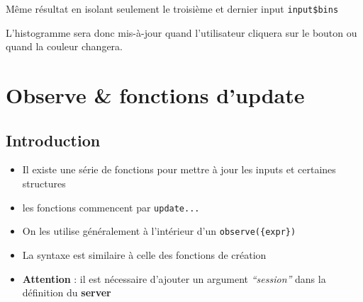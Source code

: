 \documentclass[
]{article}
\newenvironment{Shaded}{\begin{snugshade}}{\end{snugshade}}
\newcommand{\AttributeTok}[1]{\textcolor[rgb]{0.13,0.29,0.53}{#1}}
\newcommand{\DecValTok}[1]{\textcolor[rgb]{0.00,0.00,0.81}{#1}}
\newcommand{\FunctionTok}[1]{\textcolor[rgb]{0.13,0.29,0.53}{\textbf{#1}}}
\newcommand{\NormalTok}[1]{#1}
\newcommand{\OtherTok}[1]{\textcolor[rgb]{0.56,0.35,0.01}{#1}}
\newcommand{\SpecialCharTok}[1]{\textcolor[rgb]{0.81,0.36,0.00}{\textbf{#1}}}
\newcommand{\StringTok}[1]{\textcolor[rgb]{0.31,0.60,0.02}{#1}}
\begin{document}
Même résultat en isolant seulement le troisième et dernier input
\texttt{input\$bins}

\begin{Shaded}
\end{Shaded}

L'histogramme sera donc mis-à-jour quand l'utilisateur cliquera sur le
bouton ou quand la couleur changera.

\hypertarget{observe-fonctions-dupdate}{%
\section{Observe \& fonctions
d'update}\label{observe-fonctions-dupdate}}

\hypertarget{introduction-1}{%
\subsection{Introduction}\label{introduction-1}}

\begin{itemize}
\item
  Il existe une série de fonctions pour mettre à jour les inputs et
  certaines structures
\item
  les fonctions commencent par \texttt{update...}
\item
  On les utilise généralement à l'intérieur d'un
  \texttt{observe(\{expr\})}
\item
  La syntaxe est similaire à celle des fonctions de création
\item
  \textbf{Attention} : il est nécessaire d'ajouter un argument
  \emph{``session''} dans la définition du \textbf{server}
\end{itemize}
\end{document}
